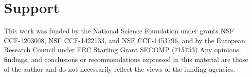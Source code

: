 \begingroup
\let\clearpage\relax
\let\cleardoublepage\relax
\let\cleardoublepage\relax
\chapter*{Support}
This work was funded by the National Science Foundation under grants NSF
CCF-1203008, NSF CCF-1422133, and NSF CCF-1453796, and by
the European Research Council under ERC Starting Grant SECOMP (715753)
Any opinions, findings, and conclusions or recommendations expressed in this
material are those of the author and do not necessarily reflect the views of the
funding agencies.
\endgroup
